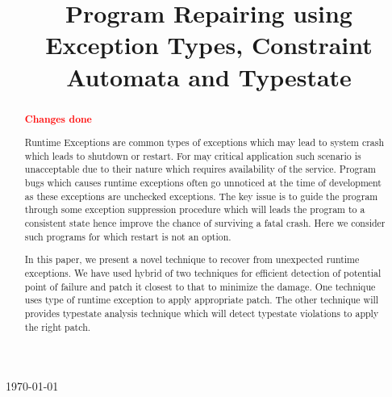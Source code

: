 \documentclass{sigplanconf}
\begin{document}
\setlength{\pdfpageheight}{\paperheight}
\setlength{\pdfpagewidth}{\paperwidth}






\title{Program Repairing using Exception Types, Constraint Automata and Typestate}

           {\today}
           {}

\maketitle

\begin{abstract}

\textcolor{red}{\textbf{Changes done}}\newline

Runtime Exceptions are common types of exceptions which may lead to system crash which leads to shutdown or restart. 
For may critical application such scenario is unacceptable due to their nature which requires availability of the service. 
Program bugs which causes runtime exceptions often go unnoticed at the time of development as these exceptions are unchecked exceptions. 
The key issue is to guide the program through some exception suppression procedure which will leads the program to a consistent state 
hence improve the chance of surviving a fatal crash. Here we consider such programs for which restart is not an option.

In this paper, we present a novel technique to recover from unexpected runtime exceptions.
 We have used hybrid of two techniques for efficient detection of potential point of failure and patch it closest to that to minimize the damage. 
 One technique uses type of runtime exception to apply appropriate patch.  
 The other technique will provides typestate analysis technique which will detect typestate violations to apply the right patch.

\end{abstract}
\end{document}

